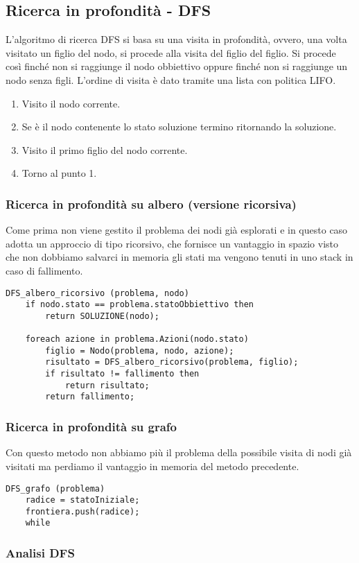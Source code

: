 \subsection{Ricerca in profondit\`a - DFS}
L'algoritmo di ricerca DFS si basa su una visita in profondit\`a, ovvero, una volta visitato
un figlio del nodo, si procede alla visita del figlio del figlio. Si procede cos\`i finch\'e
non si raggiunge il nodo obbiettivo oppure finch\'e non si raggiunge un nodo senza figli.
L'ordine di visita \`e dato  tramite una lista con politica LIFO.
\begin{enumerate}
	\item Visito il nodo corrente.
	\item Se \`e il nodo contenente lo stato soluzione termino ritornando la soluzione.
	\item Visito il primo figlio del nodo corrente.
	\item Torno al punto 1.
\end{enumerate}

\subsubsection{Ricerca in profondit\`a su albero (versione ricorsiva)}
Come prima non viene gestito il problema dei nodi gi\`a esplorati e in questo caso adotta un
approccio di tipo ricorsivo, che fornisce un vantaggio in spazio visto che non dobbiamo
salvarci in memoria gli stati ma vengono tenuti in uno stack in caso di fallimento.
\begin{lstlisting}[style=pseudo-style]
DFS_albero_ricorsivo (problema, nodo)
	if nodo.stato == problema.statoObbiettivo then
		return SOLUZIONE(nodo);
	
	foreach azione in problema.Azioni(nodo.stato)
		figlio = Nodo(problema, nodo, azione);
		risultato = DFS_albero_ricorsivo(problema, figlio);
		if risultato != fallimento then
			return risultato;
		return fallimento;
\end{lstlisting}

\subsubsection{Ricerca in profondit\`a su grafo}
Con questo metodo non abbiamo pi\`u il problema della possibile visita di nodi gi\`a visitati
ma perdiamo il vantaggio in memoria del metodo precedente.
\begin{lstlisting}[style=pseudo-style]
DFS_grafo (problema)
	radice = statoIniziale;
	frontiera.push(radice);
	while 
\end{lstlisting}

\subsubsection{Analisi DFS}
